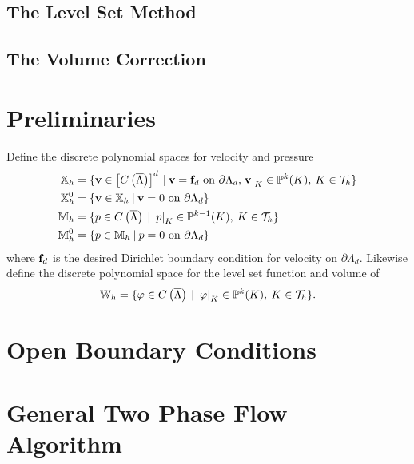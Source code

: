 \documentclass[letterpaper]{erdc}
\begin{document}
\subsection{The Level Set Method}\label{sec:LevelSetMethod}

\subsection{The Volume Correction}\label{sec:VolumeCorrection}



%
%
%
\section{Preliminaries}\label{sec:2PPreliminaries}
Define the discrete polynomial spaces for velocity and pressure
\begin{align*}  
	\mathbb{X}_h &= \{\textbf{v}\in \left[C\left(\overline{\Lambda}\right)\right]^d \:|\: \textbf{v} = \mathbf{f}_d \mbox{ on } \partial\Lambda_{d}, \left.\textbf{v}\right|_{K}\in\mathbb{P}^{k}(K), \:K\in\mathcal{T}_h  \} \\
  	\mathbb{X}^0_h &= \{\textbf{v}\in \mathbb{X}_h \:|\: \textbf{v} = 0 \mbox{ on } \partial\Lambda_{d} \} \\
		\mathbb{M}_h &= \{p\in C\left(\overline{\Lambda}\right) \:|\: \left.p\right|_{K}\in\mathbb{P}^{k-1}(K),\: K\in\mathcal{T}_h  \}\\
    \mathbb{M}^{0}_h &= \{p\in \mathbb{M}_h \:|\: p = 0 \mbox{ on } \partial\Lambda_{d} \}
\end{align*} 
where $\mathbf{f}_d$ is the desired Dirichlet boundary condition for velocity on $\partial\Lambda_{d}$.  Likewise define the discrete polynomial space for the level set function and volume of 
\begin{equation*}
\mathbb{W}_h = \{ \varphi \in C\left(\overline{\Lambda}\right) \:|\: \left.\varphi\right|_{K} \in \mathbb{P}^{k}(K),\: K\in\mathcal{T}_h \}.
\end{equation*}

%
%
%
\section{Open Boundary Conditions}\label{sec:OpenBoundaryConditions}



%
%
%
\section{General Two Phase Flow Algorithm}\label{sec:General2PFlowAlgorithm}
\end{document}
